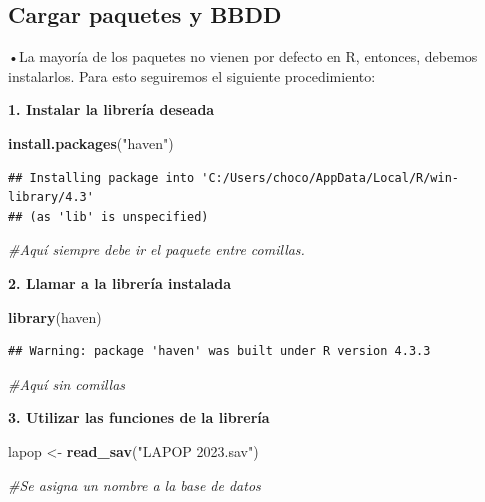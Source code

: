 \documentclass[
]{article}
\newenvironment{Shaded}{\begin{snugshade}}{\end{snugshade}}
\newcommand{\CommentTok}[1]{\textcolor[rgb]{0.56,0.35,0.01}{\textit{#1}}}
\newcommand{\FunctionTok}[1]{\textcolor[rgb]{0.13,0.29,0.53}{\textbf{#1}}}
\newcommand{\NormalTok}[1]{#1}
\newcommand{\OtherTok}[1]{\textcolor[rgb]{0.56,0.35,0.01}{#1}}
\newcommand{\StringTok}[1]{\textcolor[rgb]{0.31,0.60,0.02}{#1}}
\begin{document}
\subsection{Cargar paquetes y BBDD}\label{cargar-paquetes-y-bbdd}

•La mayoría de los paquetes no vienen por defecto en R, entonces,
debemos instalarlos. Para esto seguiremos el siguiente procedimiento:

\textbf{1. Instalar la librería deseada}

\begin{Shaded}
\begin{Highlighting}[]
\FunctionTok{install.packages}\NormalTok{(}\StringTok{"haven"}\NormalTok{)}
\end{Highlighting}
\end{Shaded}

\begin{verbatim}
## Installing package into 'C:/Users/choco/AppData/Local/R/win-library/4.3'
## (as 'lib' is unspecified)
\end{verbatim}

\begin{Shaded}
\begin{Highlighting}[]
\CommentTok{\#Aquí siempre debe ir el paquete entre comillas.}
\end{Highlighting}
\end{Shaded}

\textbf{2. Llamar a la librería instalada}

\begin{Shaded}
\begin{Highlighting}[]
\FunctionTok{library}\NormalTok{(haven)}
\end{Highlighting}
\end{Shaded}

\begin{verbatim}
## Warning: package 'haven' was built under R version 4.3.3
\end{verbatim}

\begin{Shaded}
\begin{Highlighting}[]
\CommentTok{\#Aquí sin comillas}
\end{Highlighting}
\end{Shaded}

\textbf{3. Utilizar las funciones de la librería}

\begin{Shaded}
\begin{Highlighting}[]
\NormalTok{lapop }\OtherTok{\textless{}{-}} \FunctionTok{read\_sav}\NormalTok{(}\StringTok{"LAPOP 2023.sav"}\NormalTok{)}

\CommentTok{\#Se asigna un nombre a la base de datos}
\end{Highlighting}
\end{Shaded}
\end{document}
